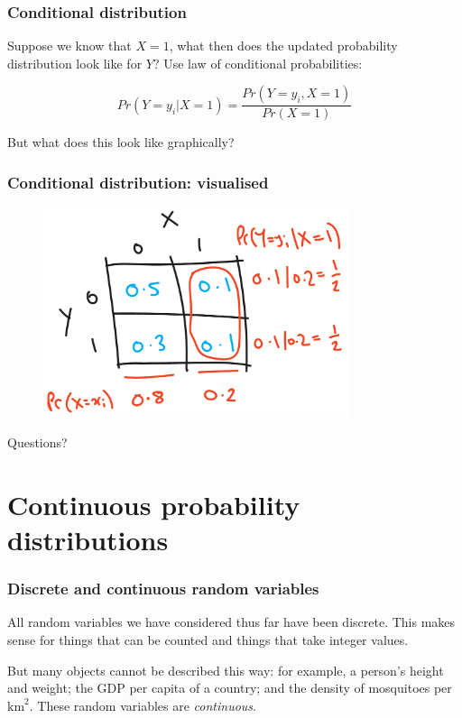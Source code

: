 \documentclass{beamer}
\begin{document}
	\begin{frame}
		\frametitle{Conditional distribution}
		
		Suppose we know that $X=1$, what then does the updated probability distribution look like for $Y$? Use law of conditional probabilities:
		
		\begin{equation}
		Pr(Y=y_i|X=1) = \frac{Pr(Y=y_i,X=1)}{Pr(X=1)}
		\end{equation}
		
		But what does this look like graphically?
		
	\end{frame}
	
	\begin{frame}
		\frametitle{Conditional distribution: visualised}
		
		\begin{figure}[ht]
			\centerline{\includegraphics[width=0.8\textwidth]{./figures/horse_race_conditional.pdf}}
		\end{figure}
		
	\end{frame}
	
	\begin{frame}
		\Large Questions?
	\end{frame}
	
	\section{Continuous probability distributions}
	\frame{\tableofcontents[currentsection]}
	
	\begin{frame}
		\frametitle{Discrete and continuous random variables}
		
		All random variables we have considered thus far have been discrete. This makes sense for things that can be counted and things that take integer values.
		
		\vspace{0.5cm}
		
		But many objects cannot be described this way: for example, a person's height and weight; the GDP per capita of a country; and the density of mosquitoes per $\text{km}^2$. These random variables are \textit{continuous}.
		
	\end{frame}
	
\end{document}
